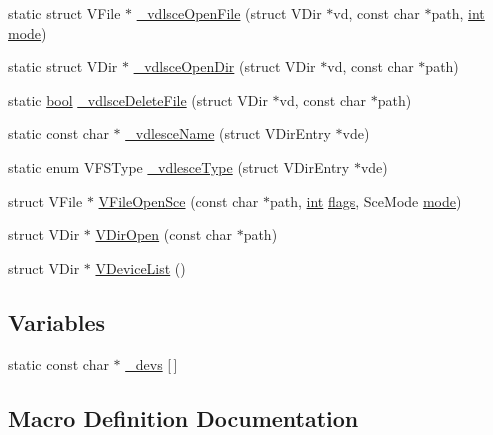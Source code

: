 \begin{DoxyCompactItemize}
\item 
static struct V\+File $\ast$ \mbox{\hyperlink{sce-vfs_8c_aa338c926cc1b185d9be42e478649e857}{\+\_\+vdlsce\+Open\+File}} (struct V\+Dir $\ast$vd, const char $\ast$path, \mbox{\hyperlink{ioapi_8h_a787fa3cf048117ba7123753c1e74fcd6}{int}} \mbox{\hyperlink{ioapi_8h_a7e43d41c2fe013a373b540cba02505cf}{mode}})
\item 
static struct V\+Dir $\ast$ \mbox{\hyperlink{sce-vfs_8c_a0577478b314a3785a307d6ccfefb9627}{\+\_\+vdlsce\+Open\+Dir}} (struct V\+Dir $\ast$vd, const char $\ast$path)
\item 
static \mbox{\hyperlink{libretro_8h_a4a26dcae73fb7e1528214a068aca317e}{bool}} \mbox{\hyperlink{sce-vfs_8c_aa4ebf2aba1bb6870bb1307f013c96403}{\+\_\+vdlsce\+Delete\+File}} (struct V\+Dir $\ast$vd, const char $\ast$path)
\item 
static const char $\ast$ \mbox{\hyperlink{sce-vfs_8c_ae3b351bf034b273f767968418e12954d}{\+\_\+vdlesce\+Name}} (struct V\+Dir\+Entry $\ast$vde)
\item 
static enum V\+F\+S\+Type \mbox{\hyperlink{sce-vfs_8c_a722290117273ac55b2ebd5709d2319e0}{\+\_\+vdlesce\+Type}} (struct V\+Dir\+Entry $\ast$vde)
\item 
struct V\+File $\ast$ \mbox{\hyperlink{sce-vfs_8c_ad40fac94880c0fb95185d3d03f43234b}{V\+File\+Open\+Sce}} (const char $\ast$path, \mbox{\hyperlink{ioapi_8h_a787fa3cf048117ba7123753c1e74fcd6}{int}} \mbox{\hyperlink{lr35902_2decoder_8c_a11f29eea941556f0630cfd3285f565c0}{flags}}, Sce\+Mode \mbox{\hyperlink{ioapi_8h_a7e43d41c2fe013a373b540cba02505cf}{mode}})
\item 
struct V\+Dir $\ast$ \mbox{\hyperlink{sce-vfs_8c_a2966065604f0fcfa278b5246d4d653b9}{V\+Dir\+Open}} (const char $\ast$path)
\item 
struct V\+Dir $\ast$ \mbox{\hyperlink{sce-vfs_8c_a36b1aed5737fa71dced20925de25a143}{V\+Device\+List}} ()
\end{DoxyCompactItemize}
\subsection*{Variables}
\begin{DoxyCompactItemize}
\item 
static const char $\ast$ \mbox{\hyperlink{sce-vfs_8c_a4fdcada72ae34de7959080b6af5ce2bd}{\+\_\+devs}} \mbox{[}$\,$\mbox{]}
\end{DoxyCompactItemize}


\subsection{Macro Definition Documentation}
\mbox{\label{sce-vfs_8c_a8ee878502d4240f77073d169f35ec4ba}} 
